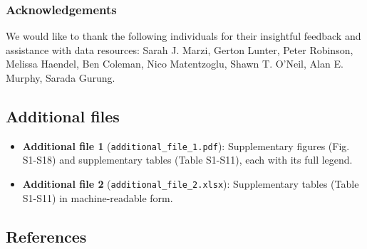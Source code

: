 \documentclass[
]{article}
\providecommand{\tightlist}{%
  \setlength{\itemsep}{0pt}\setlength{\parskip}{0pt}}
\begin{document}
\subsubsection{Acknowledgements}\label{acknowledgements}

We would like to thank the following individuals for their insightful
feedback and assistance with data resources: Sarah J. Marzi, Gerton
Lunter, Peter Robinson, Melissa Haendel, Ben Coleman, Nico Matentzoglu,
Shawn T. O'Neil, Alan E. Murphy, Sarada Gurung.

\subsection{Additional files}\label{additional-files}

\begin{itemize}
\tightlist
\item
  \textbf{Additional file 1} (\texttt{additional\_file\_1.pdf}):
  Supplementary figures (Fig. S1-S18) and supplementary tables (Table
  S1-S11), each with its full legend.
\item
  \textbf{Additional file 2} (\texttt{additional\_file\_2.xlsx}):
  Supplementary tables (Table S1-S11) in machine-readable form.
\end{itemize}

\subsection*{References}\label{references}
\end{document}
